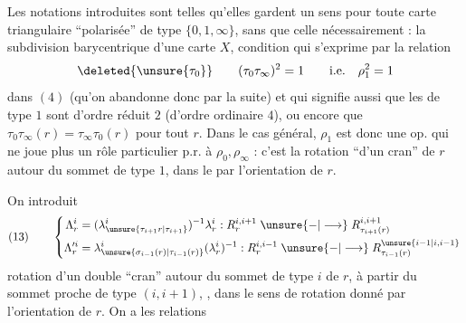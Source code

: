 
Les notations introduites sont telles qu'elles gardent un sens pour toute carte triangulaire ``polarisée'' de type $\{0,1,\infty\}$, sans que celle  nécessairement : la subdivision barycentrique d'une carte $X$, condition qui s'exprime par la   relation
\[
\deleted{\unsure{\tau_0}}\qquad (\tau_0\tau_\infty)^2=1\qquad\text{i.e.}\quad\rho_1^2=1
\]
dans $(4)$ (qu'on abandonne donc par la suite) et qui signifie aussi que les   de type $1$ sont d'ordre réduit $2$ (d'ordre ordinaire $4$), ou encore que $\tau_0\tau_\infty(r)=\tau_\infty\tau_0(r)$ pour tout $r$. Dans le cas général, $\rho_1$ est donc une op. qui ne joue plus un rôle particulier p.r. à $\rho_0,\rho_\infty$ : c'est la rotation ``d'un cran'' de $r$ autour du sommet de type $1$, dans le   par l'orientation de $r$.

On introduit
\[
(13)\qquad\left\{
\begin{aligned}
\Lambda_r^i&=(\lambda_{\unsure{\tau_{i+1}r|\tau_{i+1}}}^i)^{-1}\lambda_r^i:R_r^{i,i+1}\mathrel{\unsure{-|\longrightarrow}} R_{\tau_{i+1}(r)}^{i,i+1}\\
\Lambda_r^{\prime i}&=\lambda_{\unsure{\sigma_{i-1}(r)|\tau_{i-1}(r)}}^i(\lambda_r^i)^{-1}:R_r^{i,i-1}\mathrel{\unsure{-|\longrightarrow}} R_{\tau_{i-1}(r)}^{\unsure{i-1|i,i-1}}
\end{aligned}\right.
\]
rotation d'un double ``cran'' autour du sommet de type $i$ de $r$, à partir du sommet proche de type $(i,i+1)$, , dans le sens de rotation donné par l'orientation de $r$.  On a les relations

